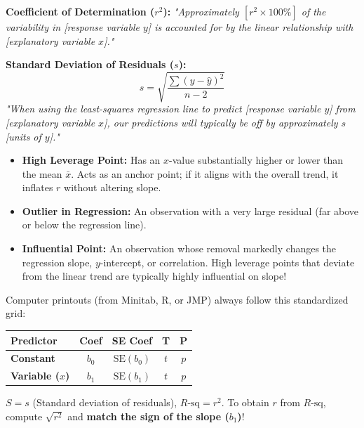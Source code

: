 \begin{lessonbox}
\begin{frqrubricbox}
\textbf{Coefficient of Determination ($r^2$):}
\textit{"Approximately $[r^2 \times 100\%]$ of the variability in [response variable $y$] is accounted for by the linear relationship with [explanatory variable $x$]."}

\textbf{Standard Deviation of Residuals ($s$):}
\begin{equation}
  s = \sqrt{\frac{\sum (y - \hat{y})^2}{n - 2}}
\end{equation}
\textit{"When using the least-squares regression line to predict [response variable $y$] from [explanatory variable $x$], our predictions will typically be off by approximately $s$ [units of $y$]."}
\end{frqrubricbox}
\end{lessonbox}

\begin{lessonbox}
\begin{itemize}[leftmargin=1.2em]
  \item \textbf{High Leverage Point:} Has an $x$-value substantially higher or lower than the mean $\bar{x}$. Acts as an anchor point; if it aligns with the overall trend, it inflates $r$ without altering slope.
  \item \textbf{Outlier in Regression:} An observation with a very large residual (far above or below the regression line).
  \item \textbf{Influential Point:} An observation whose removal markedly changes the regression slope, $y$-intercept, or correlation. High leverage points that deviate from the linear trend are typically highly influential on slope!
\end{itemize}
\end{lessonbox}

\begin{lessonbox}
Computer printouts (from Minitab, R, or JMP) always follow this standardized grid:
\begin{center}
\begin{tabular}{lcccc}
\toprule
\textbf{Predictor} & \textbf{Coef} & \textbf{SE Coef} & \textbf{T} & \textbf{P} \\
\midrule
\textbf{Constant} & $b_0$ & $\text{SE}(b_0)$ & $t$ & $p$ \\
\textbf{Variable ($x$)} & $b_1$ & $\text{SE}(b_1)$ & $t$ & $p$ \\
\bottomrule
\end{tabular}
\end{center}
$S = s$ (Standard deviation of residuals), $R\text{-sq} = r^2$.
To obtain $r$ from $R\text{-sq}$, compute $\sqrt{r^2}$ and \textbf{match the sign of the slope ($b_1$)}!
\end{lessonbox}

